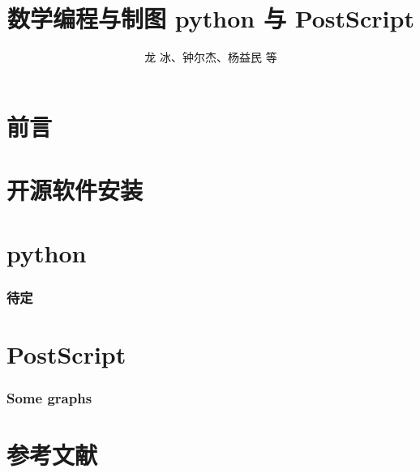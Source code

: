 \documentclass[zihao=-4,linespread=1.5,heading=true,a4paper,twoside]{ctexart}
\title{数学编程与制图 python 与 PostScript}
\author{龙 冰、钟尔杰、杨益民 等}
\begin{document}
\begin{titlepage}
	\maketitle
\end{titlepage}

\part*{前言}\label{sec:preface}


\newpage\tableofcontents

\newpage\part{开源软件安装}


\newpage\part{python}
\section{待定}\label{sec:II.1}


%



\newpage\part{PostScript}
\section{Some graphs}


%





\newpage\part*{参考文献}
\printbibliography[heading=none]
\end{document}
